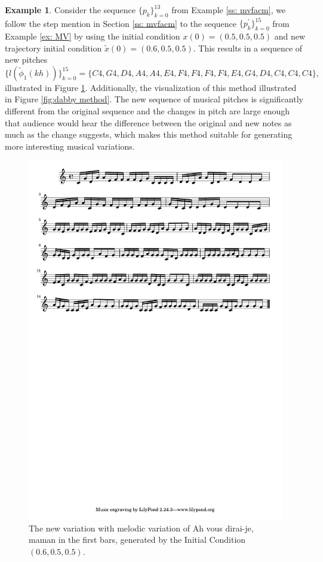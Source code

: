 \documentclass[11pt]{article}
\theoremstyle{definition}
\newtheorem{example}[theorem]{Example}
\begin{document}
\begin{example}

Consider the sequence $\{p_k\}_{k=0}^{13}$ from Example \ref{ss: mvfacm}, we follow the step mention in Section \ref{ss: mvfacm} to the sequence $\{p^\prime_k\}_{k=0}^{15}$ from Example \ref{ex: MV} by using the initial condition $x(0) = (0.5,0.5,0.5)$ and new trajectory initial condition $\tilde{x}(0) = (0.6,0.5,0.5)$. 
This results in a sequence of new pitches \[ \{l(\tilde{\phi}_1(kh))\}_{k = 0}^{15} = \{C4, G4, D4, A4, A4, E4, F4, F4, F4, F4, E4, G4, D4, C4, C4, C4 \}, \] illustrated in Figure \ref{fig:DabbyER}. Additionally, the visualization of this method illustrated in Figure \ref{fig:dabby method}. The new sequence of musical pitches is significantly different from the original sequence and the changes in pitch are large enough that audience would hear the difference between the original and new notes as much as the change suggests, which makes this method suitable for generating more interesting musical variations.

\end{example}

\begin{figure}
\centering
\includegraphics[trim=1cm 27.5cm 8.65cm 0.5cm, clip, scale=0.8]{dabby_melody_variation.pdf}
\caption{The new variation with melodic variation of Ah vous dirai-je, maman in the first bars, generated by the Initial Condition $(0.6, 0.5, 0.5)$.} 
\label{fig:DabbyER}
\end{figure}
\end{document}
